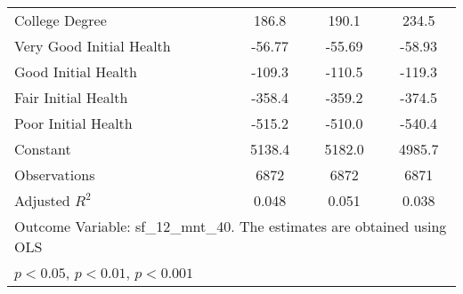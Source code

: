 \begin{table}[t]
\begin{tabular}{p{4cm}ccc}
College Degree  &    186.8\sym{***}&    190.1\sym{***}&    234.5\sym{***}\\
Very Good Initial Health&   -56.77\sym{*}  &   -55.69\sym{*}  &   -58.93\sym{*}  \\
Good Initial Health&   -109.3\sym{***}&   -110.5\sym{***}&   -119.3\sym{***}\\
Fair Initial Health&   -358.4\sym{***}&   -359.2\sym{***}&   -374.5\sym{***}\\
Poor Initial Health&   -515.2\sym{***}&   -510.0\sym{***}&   -540.4\sym{***}\\
Constant        &   5138.4\sym{***}&   5182.0\sym{***}&   4985.7\sym{***}\\\midrule
Observations    &     6872         &     6872         &     6871         \\
Adjusted \(R^{2}\)&    0.048         &    0.051         &    0.038         \\\bottomrule
\multicolumn{4}{l}{\footnotesize Outcome Variable: sf\_12\_mnt\_40. The estimates are obtained using OLS}\\
\multicolumn{4}{l}{\footnotesize \sym{*} \(p<0.05\), \sym{**} \(p<0.01\), \sym{***} \(p<0.001\)}\\
\end{tabular}
\end{table}

